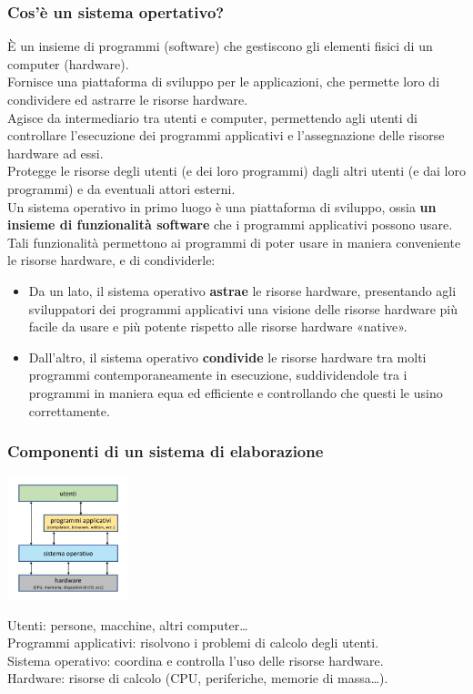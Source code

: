 \subsubsection{Cos'è un sistema opertativo?}
È un insieme di programmi (software) che gestiscono gli elementi fisici di un computer (hardware).\\
\vspace{5mm}
Fornisce una piattaforma di sviluppo per le applicazioni, che permette loro di condividere ed astrarre le risorse hardware.\\
Agisce da intermediario tra utenti e computer, permettendo agli utenti di controllare l'esecuzione dei programmi applicativi e l'assegnazione delle risorse hardware ad essi.\\
Protegge le risorse degli utenti (e dei loro programmi) dagli altri utenti (e dai loro programmi) e da eventuali attori esterni.\\
\vspace{5mm}
Un sistema operativo in primo luogo è una piattaforma di sviluppo, ossia \textbf{un insieme di funzionalità software} che i programmi applicativi possono usare.\\
Tali funzionalità permettono ai programmi di poter usare in maniera conveniente le risorse hardware, e di condividerle:
\begin{itemize}
    \item Da un lato, il sistema operativo \textbf{astrae} le risorse hardware, presentando agli sviluppatori dei programmi applicativi una visione delle risorse hardware più facile da usare e più potente rispetto alle risorse hardware «native».
    \item Dall'altro, il sistema operativo \textbf{condivide} le risorse hardware tra molti programmi contemporaneamente in esecuzione, suddividendole tra i programmi in maniera equa ed efficiente e controllando che questi le usino correttamente.
\end{itemize}

\subsubsection{Componenti di un sistema di elaborazione}
\begin{center}
    \includegraphics[width=35mm]{images/SO/SO_sistema_di_elaborazione1.jpg}
\end{center}
Utenti: persone, macchine, altri computer\dots\\
Programmi applicativi: risolvono i problemi di calcolo degli utenti.\\
Sistema operativo: coordina e controlla l'uso delle risorse hardware.\\
Hardware: risorse di calcolo (CPU, periferiche, memorie di massa\dots).


